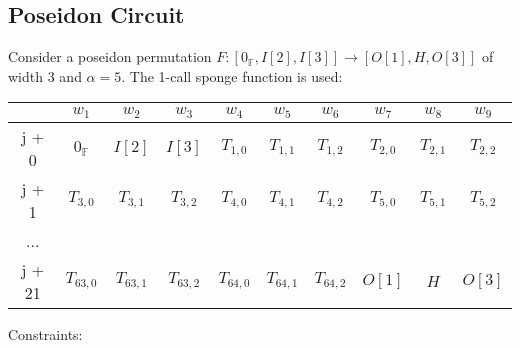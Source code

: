 \subsection{Poseidon Circuit}
\label{section:poseidon}
Consider a poseidon permutation $F: [0_{\mathbb{F}}, I[2], I[3]] \rightarrow [O[1], H, O[3]]$ of width $3$ and $\alpha = 5$.
The 1-call sponge function is used:
\begin{center}
    \begin{tabular}{ c|c|c|c|c|c|c|c|c|c }
        & $w_1$  & $w_2$  & $w_3$  & $w_4$  & $w_5$  & $w_6$ & $w_7$ & $w_8$ & $w_9$  \\
        \hline
        j + 0  & $0_{\mathbb{F}}$ & $I[2]$ & $I[3]$ & $T_{1,0}$ & $T_{1,1}$ & $T_{1,2}$ & $T_{2,0}$ & $T_{2,1}$ & $T_{2,2}$ \\
        j + 1   & $T_{3,0}$ & $T_{3,1}$ & $T_{3,2}$ & $T_{4,0}$ & $T_{4,1}$ & $T_{4,2}$ & $T_{5,0}$ & $T_{5,1}$ & $T_{5,2}$\\
        ...    &                  &           &           &           &           \\
        j + 21 & $T_{63,0}$ & $T_{63,1}$ & $T_{63,2}$ & $T_{64,0}$ & $T_{64,1}$ & $T_{64,2}$ & $O[1]$ & $H$ & $O[3]$ \\
    \end{tabular}
\end{center}
Constraints:
